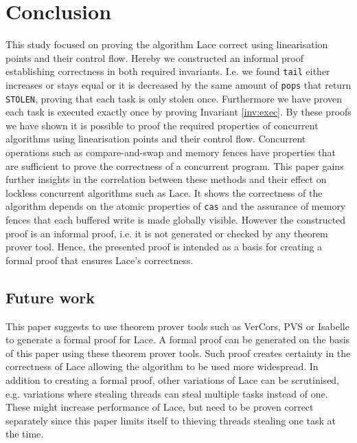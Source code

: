 \documentclass{sig-alternate-br}
\begin{document}
\section{Conclusion}
This study focused on proving the algorithm Lace correct using linearisation points and their control flow.
Hereby we constructed an informal proof establishing correctness in both required invariants.
I.e. we found \texttt{tail} either increases or stays equal or it is decreased by the same amount of \texttt{pops} that return \texttt{STOLEN}, proving that each task is only stolen once.
Furthermore we have proven each task is executed exactly once by proving Invariant \ref{inv:exec}.
By these proofs we have shown it is possible to proof the required properties of concurrent algorithms using linearisation points and their control flow.
Concurrent operations such as compare-and-swap and memory fences have properties that are sufficient to prove the correctness of a concurrent program.
This paper gains further insights in the correlation between these methods and their effect on lockless concurrent algorithms such as Lace.
It shows the correctness of the algorithm depends on the atomic properties of \texttt{cas} and the assurance of memory fences that each buffered write is made globally visible.
However the constructed proof is an informal proof, i.e. it is not generated or checked by any theorem prover tool.
Hence, the presented proof is intended as a basis for creating a formal proof that ensures Lace's correctness.

\subsection{Future work}
This paper suggests to use theorem prover tools such as VerCors\cite{eemcs24905}, PVS\cite{owre1992pvs} or Isabelle\cite{paulson1994isabelle} to generate a formal proof for Lace.
A formal proof can be generated on the basis of this paper using these theorem prover tools.
Such proof creates certainty in the correctness of Lace allowing the algorithm to be used more widespread.
In addition to creating a formal proof, other variations of Lace can be scrutinised, e.g. variations where stealing threads can steal multiple tasks instead of one.
These might increase performance of Lace, but need to be proven correct separately since this paper limits itself to thieving threads stealing one task at the time.



\appendix
\end{document}
